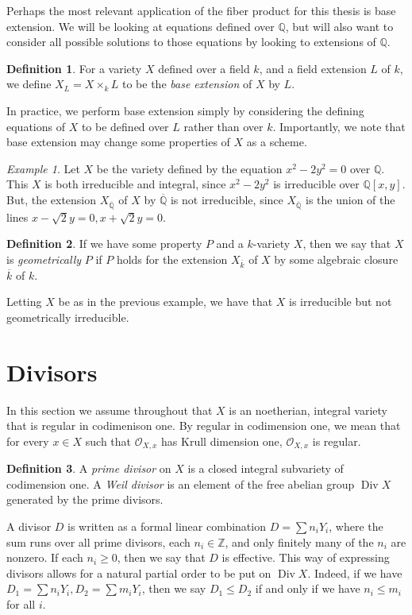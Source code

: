 \documentclass[12pt,twoside]{reedthesis}
\theoremstyle{plain}
\theoremstyle{definition}
\newtheorem{definition}{Definition}[section]
\theoremstyle{remark}
\newtheorem{example}{Example}[section]
\newcommand{\ZZ}{\mathbb{Z}}
\newcommand{\QQ}{\mathbb{Q}}
\newcommand{\calO}{\mathcal{O}}
\newcommand{\Div}{\operatorname{Div}}
\begin{document}
Perhaps the most relevant application of the fiber product for this thesis is base extension. We will be looking at equations defined over $\QQ$, but will also want to consider all possible solutions to those equations by looking to extensions of $\QQ$.
\begin{definition}
For a variety $X$ defined over a field $k$, and a field extension $L$ of $k$, we define $X_L=X\times_k L$ to be the \emph{base extension} of $X$ by $L$.
\end{definition}
\noindent In practice, we perform base extension simply by considering the defining equations of $X$ to be defined over $L$ rather than over $k$. Importantly, we note that base extension may change some properties of $X$ as a scheme.

\begin{example}
Let $X$ be the variety defined by the equation $x^2-2y^2=0$ over $\QQ$. This $X$ is both irreducible and integral, since $x^2-2y^2$ is irreducible over $\QQ[x,y]$. But, the extension $X_{\overline{\QQ}}$ of $X$ by $\overline{\QQ}$ is not irreducible, since $X_{\overline{\QQ}}$ is the union of the lines $x-\sqrt{2}y=0, x+\sqrt{2}y=0$.
\end{example}

\begin{definition}
If we have some property $P$ and a $k$-variety $X$, then we say that $X$ is \emph{geometrically} $P$ if $P$ holds for the extension $X_{\overline{k}}$ of $X$ by some algebraic closure $\overline{k}$ of $k$.
\end{definition}
\noindent Letting $X$ be as in the previous example, we have that $X$ is irreducible but not geometrically irreducible.

\section{Divisors}
In this section we assume throughout that $X$ is an noetherian, integral variety that is regular in codimenison one. By regular in codimension one, we mean that for every $x\in X$ such that $\calO_{X,x}$ has Krull dimension one, $\calO_{X,x}$ is regular.

\begin{definition}
A \emph{prime divisor} on $X$ is a closed integral subvariety of codimension one. A \emph{Weil divisor} is an element of the free abelian group $\Div X$ generated by the prime divisors. 
\end{definition}
A divisor $D$ is written as a formal linear combination $D=\sum n_i Y_i$, where the sum runs over all prime divisors, each $n_i\in\ZZ$, and only finitely many of the $n_i$ are nonzero. If each $n_i\geq 0$, then we say that $D$ is effective. This way of expressing divisors allows for a natural partial order to be put on $\Div X$. Indeed, if we have $D_1=\sum n_i Y_i, D_2=\sum m_i Y_i$, then we say $D_1\leq D_2$ if and only if we have $n_i\leq m_i$ for all $i$.
\end{document}
